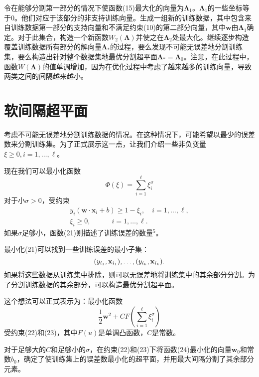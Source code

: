 \documentclass[lang=cn,11pt,a4paper]{elegantpaper}
\begin{document}
	令在能够分割第一部分的情况下使函数(15)最大化的向量为$\mathbf{\Lambda}_1$。$\mathbf{\Lambda}_1$的一些坐标等于$0$。他们对应于该部分的非支持训练向量。生成一组新的训练数据，其中包含来自训练数据第一部分的支持向量和不满足约束(10)的第二部分向量，其中$\mathbf{w}$由$\mathbf{\Lambda}_1$确定。对于此集合，构造一个新函数$W_2(\mathbf{\Lambda})$并使之在$\mathbf{\Lambda}_2$处最大化。继续逐步构造覆盖训练数据所有部分的解向量$\mathbf{\Lambda}_*$的过程，要么发现不可能无误差地分割训练集，要么构造出针对整个数据集地最优分割超平面$\mathbf{\Lambda}_*=\mathbf{\Lambda}_0$。注意，在此过程中，函数$W(\mathbf{\Lambda})$的值单调增加，因为在优化过程中考虑了越来越多的训练向量，导致两类之间的间隔越来越小。

	\section{软间隔超平面}
	考虑不可能无误差地分割训练数据的情况。在这种情况下，可能希望以最少的误差数来分割训练集。为了正式展示这一点，让我们介绍一些非负变量$\xi\geq0,i=1,\dots,\ell$。

	现在我们可以最小化函数
	\begin{equation}
		\Phi(\xi)=\sum_{i=1}^\ell\xi_i^\sigma\tag{21}
	\end{equation}
	对于小$\sigma>0$，受约束
	\begin{align}
		y_i(\mathbf{w}·\mathbf{x}_i+b) \geq 1-\xi_i,\quad i=1,\dots,\ell, \tag{22} \\
		\xi_i \geq 0,\quad \qquad i=1,\dots,\ell.\tag{23}
	\end{align}
	如果$\sigma$足够小，函数(21)则描述了训练误差的数量$^5$。

	最小化(21)可以找到一些训练误差的最小子集：
	\begin{equation}
		(y_{i_1},\mathbf{x}_{i_1}),\dots,(y_{i_k},\mathbf{x}_{i_k}).\notag
	\end{equation}
	如果将这些数据从训练集中排除，则可以无误差地将训练集中的其余部分分割。为了分割训练数据的其余部分，可以构造最优分割超平面。

	这个想法可以正式表示为：最小化函数
	\begin{equation}
		\frac{1}{2}\mathbf{w}^2+CF\left(\sum_{i=1}^{\ell}\xi_i^\sigma\right)\tag{24}
	\end{equation}
	受约束(22)和(23)，其中$F(u)$是单调凸函数，$C$是常数。

	对于足够大的$C$和足够小的$\sigma$，在约束(22)和(23)下将函数(24)最小化的向量$\mathbf{w}_0$和常数$b_0$，确定了使训练集上的误差数最小化的超平面，并用最大间隔分割了其余部分元素。
\end{document}
